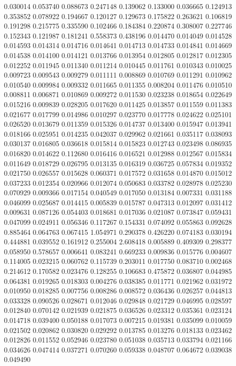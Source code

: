 0.030014
0.053740
0.088673
0.247148
0.139062
0.133000
0.036665
0.124913
0.353852
0.078922
0.194667
0.120127
0.129673
0.175822
0.263621
0.106819
0.191298
0.215775
0.335590
0.102466
0.184384
0.220874
0.308007
0.227746
0.152343
0.121987
0.181241
0.558373
0.438196
0.014470
0.014049
0.014528
0.014593
0.014314
0.014716
0.014641
0.014713
0.014733
0.014841
0.014669
0.014538
0.014100
0.014121
0.013766
0.013954
0.012805
0.012817
0.012305
0.012252
0.011945
0.011340
0.011214
0.010445
0.011761
0.010343
0.010025
0.009723
0.009543
0.009279
0.011111
0.008869
0.010769
0.011291
0.010962
0.010540
0.009984
0.009332
0.011665
0.011355
0.008204
0.011476
0.010510
0.008811
0.006871
0.010869
0.009272
0.011530
0.023238
0.018654
0.022649
0.015216
0.009839
0.028205
0.017620
0.011425
0.013857
0.011559
0.011383
0.021677
0.017799
0.014986
0.010297
0.023770
0.017778
0.024622
0.025101
0.026520
0.013679
0.011359
0.015326
0.014737
0.013400
0.015947
0.013941
0.018166
0.025951
0.014235
0.042037
0.029962
0.021661
0.035117
0.038093
0.030137
0.016805
0.036618
0.015814
0.015823
0.012743
0.023498
0.086935
0.016820
0.014622
0.112680
0.016416
0.016521
0.012988
0.012567
0.015834
0.011649
0.018729
0.026795
0.013135
0.016319
0.036725
0.057834
0.019352
0.021750
0.026557
0.015628
0.060371
0.017572
0.031658
0.014870
0.015012
0.037233
0.012354
0.020966
0.012074
0.050683
0.033782
0.028978
0.025230
0.070929
0.009366
0.017154
0.040549
0.017050
0.013184
0.007331
0.031188
0.046099
0.025687
0.014415
0.005839
0.015787
0.047313
0.012097
0.031412
0.009631
0.087126
0.054403
0.018681
0.017036
0.021087
0.073847
0.059431
0.047099
0.024911
0.056346
0.117267
0.154331
0.074092
0.055863
0.092628
0.885464
0.064763
0.067415
1.054971
0.290378
0.426220
0.074183
0.030194
0.444881
0.039552
0.161912
0.255004
2.608418
0.005889
0.409309
0.298377
0.058950
0.578657
0.006641
0.083241
0.669233
0.009836
0.015776
0.004607
0.114005
0.023215
0.060762
0.115739
0.203011
0.017750
0.083710
0.002468
0.214612
0.170582
0.023476
0.128255
0.106683
0.475872
0.036807
0.044985
0.064381
0.019265
0.018303
0.004276
0.038385
0.011771
0.021962
0.031972
0.010950
0.018285
0.007756
0.008286
0.008572
0.036436
0.026257
0.044813
0.033328
0.090526
0.028671
0.012046
0.029848
0.021729
0.046995
0.028597
0.012840
0.070142
0.021939
0.021875
0.036526
0.023312
0.035361
0.023124
0.014718
0.039400
0.050188
0.017073
0.007215
0.019381
0.035099
0.010059
0.021502
0.020862
0.030820
0.029292
0.013785
0.013276
0.018133
0.023462
0.012826
0.011552
0.052946
0.023780
0.051038
0.035713
0.033794
0.021166
0.034626
0.047414
0.037271
0.070260
0.059338
0.048707
0.064672
0.039038
0.049490
